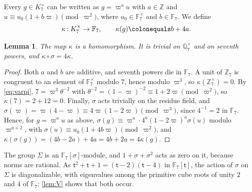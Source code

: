 \documentclass[12pt]{amsart}
\newcommand{\F}{{\mathbb F}}
\newcommand{\Q}{\mathbb{Q}}
\newcommand{\Z}{\mathbb{Z}}
\renewcommand{\t}{\mathsf{t}}
\numberwithin{equation}{section}
\newtheorem{lemma}[theorem]{Lemma}
\theoremstyle{definition}
\begin{document}
Every $g \in K_7^{\times}$ can be written as $g = \varpi^{a}u$ with $a \in \Z$ and
$u \equiv u_0(1 + b\varpi) \pmod{\varpi^2}$, where $u_0 \in \F_7^{\times}$ and
$b \in \F_7$. We define
\[
  \kappa \colon K_7^{\times} \to \F_7, \qquad \kappa(g) \colonequals b + 4a .
\]

\begin{lemma}
  \label{lem:kappa}
  The map $\kappa$ is a homomorphism. It is trivial on $\Q_7^{\times}$ and on
  seventh powers, and $\kappa \circ \sigma = 4\kappa$.
\end{lemma}
\begin{proof}
  Both $a$ and $b$ are additive, and seventh powers die in $\F_7$. A unit of
  $\Z_7$ is congruent to an element of $\F_7^\times$ modulo $7$, hence modulo
  $\varpi^3$, so $\kappa(\Z_7^{\times}) = 0$. By \cref{eq:varpi}, $7 =
  \varpi^{3}\theta^{-2}$ with $\theta^{-2} = (1-\varpi)^{-2} \equiv 1 + 2\varpi
  \pmod{\varpi^{2}}$, so $\kappa(7) = 2 + 12 = 0$. Finally, $\sigma$ acts
  trivially on the residue field, and $\sigma(\varpi) = \varpi(4 - \varpi) \equiv
  4\varpi(1 - 2\varpi) \pmod{\varpi^{3}}$, since $4^{-1} = 2$ in $\F_7$. Hence, for
  $g = \varpi^a u$ as above, $\sigma(g) \equiv \varpi^{a}\cdot 4^{a}(1 -
  2\varpi)^{a}\sigma(u)$ modulo $\varpi^{a+2}$, with $\sigma(u) \equiv u_0(1 +
  4b\varpi) \pmod{\varpi^{2}}$, and $\kappa(\sigma(g)) = (4b - 2a) + 4a = 4b + 2a
  = 4\kappa(g)$.
\end{proof}

The group $\Sigma$ is an $\F_7[\sigma]$-module, and $1 + \sigma + \sigma^2$ acts
as zero on it, because norms are rational. As $\t^{2} + \t + 1 = (\t - 2)(\t -
4)$ in $\F_7[\t]$, the action of $\sigma$ on $\Sigma$ is diagonalizable, with
eigenvalues among the primitive cube roots of unity $2$ and $4$ of $\F_7$;
\cref{lem:V} shows that both occur.
\end{document}
